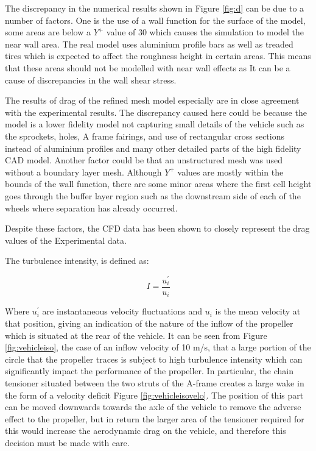 The discrepancy in the numerical results shown in Figure \ref{fig:d} can be due to a number of factors. One is the use of a wall function for the surface of the model, some areas are below a $Y^+$ value of 30 which causes the simulation to model the near wall area. The real model uses aluminium profile bars as well as treaded tires which is expected to affect the roughness height in certain areas. This means that these areas should not be modelled with near wall effects as It can be a cause of discrepancies in the wall shear stress.

The results of drag of the refined mesh model especially are in close agreement with the experimental results. The discrepancy caused here could be because the model is a lower fidelity model not capturing small details of the vehicle such as the sprockets, holes, A frame fairings, and use of rectangular cross sections instead of aluminium profiles and many other detailed parts of the high fidelity CAD model. Another factor could be that an unstructured mesh was used without a boundary layer mesh. Although $Y^+$ values are mostly within the bounds of the wall function, there are some minor areas where the first cell height goes through the buffer layer region such as the downstream side of each of the wheels where separation has already occurred.

Despite these factors, the CFD data has been shown to closely represent the drag values of the Experimental data. 

The turbulence intensity, is defined as:

\begin{equation}
    I = \frac{u^{'}_i}{u_i}
\end{equation}

Where $u^{'}_i$ are instantaneous velocity fluctuations and $u_i$ is the mean velocity at that position, giving an indication of the nature of the inflow of the propeller which is situated at the rear of the vehicle. It can be seen from Figure \ref{fig:vehicleiso}, the case of an inflow velocity of 10 m/s, that a large portion of the circle that the propeller traces is subject to high turbulence intensity which can significantly impact the performance of the propeller. In particular, the chain tensioner situated between the two struts of the A-frame creates a large wake in the form of a velocity deficit Figure \ref{fig:vehicleisovelo}. The position of this part can be moved downwards towards the axle of the vehicle to remove the adverse effect to the propeller, but in return the larger area of the tensioner required for this would increase the aerodynamic drag on the vehicle, and therefore this decision must be made with care.

